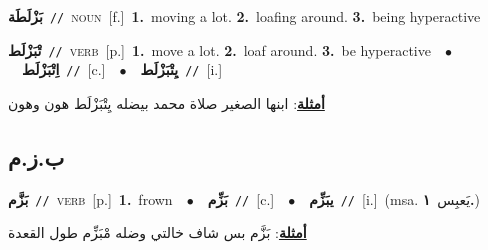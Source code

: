 \documentclass[10pt,a4paper,twoside]{article} %
\begin{document}
\begin{multicols}{2}
{\setlength\topsep{0pt}\textbf{\foreignlanguage{arabic}{بَزْلَطَة}}\ {\color{gray}\texttt{//}\color{black}}\ \textsc{noun}\ [f.]\ \textbf{1.}~moving a lot.  \textbf{2.}~loafing around.  \textbf{3.}~being hyperactive\ } \vspace{2mm}

{\setlength\topsep{0pt}\textbf{\foreignlanguage{arabic}{تْبَزْلَط}}\ {\color{gray}\texttt{//}\color{black}}\ \textsc{verb}\ [p.]\ \textbf{1.}~move a lot.  \textbf{2.}~loaf around.  \textbf{3.}~be hyperactive\ \ $\bullet$\ \ \setlength\topsep{0pt}\textbf{\foreignlanguage{arabic}{اِتْبَزْلَط}}\ {\color{gray}\texttt{//}\color{black}}\ [c.]\ \ $\bullet$\ \ \setlength\topsep{0pt}\textbf{\foreignlanguage{arabic}{يِتْبَزْلَط}}\ {\color{gray}\texttt{//}\color{black}}\ [i.]\  \begin{flushright}\color{gray}\foreignlanguage{arabic}{\textbf{\underline{\foreignlanguage{arabic}{أمثلة}}}: ابنها الصغير صلاة محمد بيضله يِتْبَزْلَط هون وهون}\end{flushright}\color{black}} \vspace{2mm}

\vspace{-3mm}
\subsection*{\color{blue}\foreignlanguage{arabic}{ب.ز.م}\color{blue}{}} 

{\setlength\topsep{0pt}\textbf{\foreignlanguage{arabic}{بَزَّم}}\ {\color{gray}\texttt{//}\color{black}}\ \textsc{verb}\ [p.]\ \textbf{1.}~frown\ \ $\bullet$\ \ \setlength\topsep{0pt}\textbf{\foreignlanguage{arabic}{بَزِّم}}\ {\color{gray}\texttt{//}\color{black}}\ [c.]\ \ $\bullet$\ \ \setlength\topsep{0pt}\textbf{\foreignlanguage{arabic}{يبَزِّم}}\ {\color{gray}\texttt{//}\color{black}}\ [i.]\ \color{gray}(msa. \foreignlanguage{arabic}{يَعبِس}~\foreignlanguage{arabic}{\textbf{١.}})\color{black}\  \begin{flushright}\color{gray}\foreignlanguage{arabic}{\textbf{\underline{\foreignlanguage{arabic}{أمثلة}}}: بَزَّم بس شاف خالتي وضله مْبَزِّم طول القعدة}\end{flushright}\color{black}} \vspace{2mm}


\end{multicols}
\end{document}
